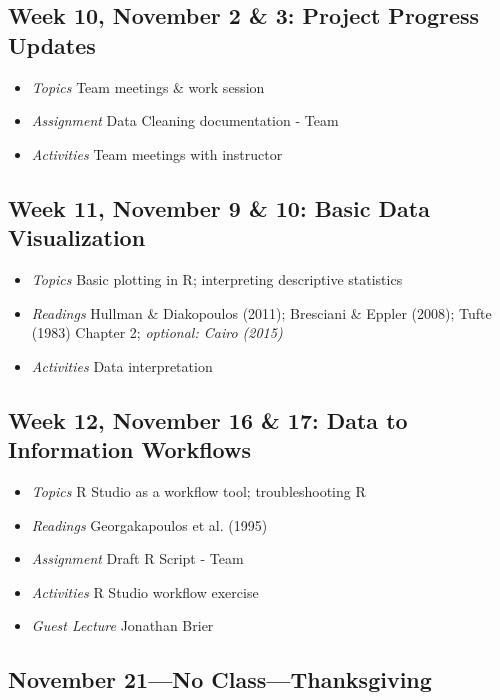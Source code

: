 \documentclass[11pt]{article}
\begin{document}
\subsection*{Week 10, November 2 \& 3: Project Progress Updates}
\begin{itemize}
\item \textit{Topics} Team meetings \& work session
\item \textit{Assignment} Data Cleaning documentation - Team
\item \textit{Activities} Team meetings with instructor
\end{itemize}

\subsection*{Week 11, November 9 \& 10: Basic Data Visualization}
\begin{itemize}
\item \textit{Topics} Basic plotting in R; interpreting descriptive statistics
\item \textit{Readings} Hullman \& Diakopoulos (2011); Bresciani \& Eppler (2008); Tufte (1983) Chapter 2; \textit{optional: Cairo (2015)}
\item \textit{Activities} Data interpretation %
\end{itemize}

\subsection*{Week 12, November 16 \& 17: Data to Information Workflows}
\begin{itemize}
\item \textit{Topics} R Studio as a workflow tool; troubleshooting R
\item \textit{Readings} Georgakapoulos et al. (1995)
\item \textit{Assignment} Draft R Script - Team
\item \textit{Activities} R Studio workflow exercise
\item \textit{Guest Lecture} Jonathan Brier
\end{itemize}

\subsection*{November 21---No Class---Thanksgiving}
\vspace{0.1in}
\end{document}
